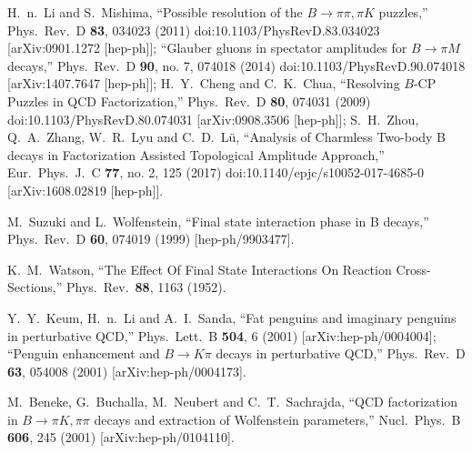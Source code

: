 \documentclass[aps,preprint,floats,epsf,epsfig,nofootinbib,letter]{revtex4}
\begin{document}
\begin{thebibliography}{99}
  H.~n.~Li and S.~Mishima,
  ``Possible resolution of the $B \to \pi \pi, \pi K$ puzzles,''
  Phys.\ Rev.\ D {\bf 83}, 034023 (2011)
  doi:10.1103/PhysRevD.83.034023
  [arXiv:0901.1272 [hep-ph]];
  ``Glauber gluons in spectator amplitudes for $B \to \pi M$ decays,''
  Phys.\ Rev.\ D {\bf 90}, no. 7, 074018 (2014)
  doi:10.1103/PhysRevD.90.074018
  [arXiv:1407.7647 [hep-ph]];
H.~Y.~Cheng and C.~K.~Chua,
  ``Resolving $B$-CP Puzzles in QCD Factorization,''
  Phys.\ Rev.\ D {\bf 80}, 074031 (2009)
  doi:10.1103/PhysRevD.80.074031
  [arXiv:0908.3506 [hep-ph]];
 S.~H.~Zhou, Q.~A.~Zhang, W.~R.~Lyu and C.~D.~Lü,
  ``Analysis of Charmless Two-body B decays in Factorization Assisted Topological Amplitude Approach,''
  Eur.\ Phys.\ J.\ C {\bf 77}, no. 2, 125 (2017)
  doi:10.1140/epjc/s10052-017-4685-0
  [arXiv:1608.02819 [hep-ph]].



M.~Suzuki and L.~Wolfenstein,
``Final state interaction phase in B decays,''
Phys.\ Rev.\ D {\bf 60}, 074019 (1999) [hep-ph/9903477].

K.~M.~Watson,
``The Effect Of Final State Interactions On Reaction Cross-Sections,''
Phys.\ Rev.\  {\bf 88}, 1163 (1952).


  Y.~Y.~Keum, H.~n.~Li and A.~I.~Sanda,
  ``Fat penguins and imaginary penguins in perturbative QCD,''
  Phys.\ Lett.\  B {\bf 504}, 6 (2001)
  [arXiv:hep-ph/0004004];
%
  ``Penguin enhancement and $B \to K \pi$ decays in perturbative QCD,''
  Phys.\ Rev.\  D {\bf 63}, 054008 (2001)
  [arXiv:hep-ph/0004173].


  M.~Beneke, G.~Buchalla, M.~Neubert and C.~T.~Sachrajda,
  ``QCD factorization in $B\to \pi K, \pi \pi$ decays and extraction of
  Wolfenstein parameters,''
  Nucl.\ Phys.\  B {\bf 606}, 245 (2001)
  [arXiv:hep-ph/0104110].



\end{thebibliography}
\end{document}
